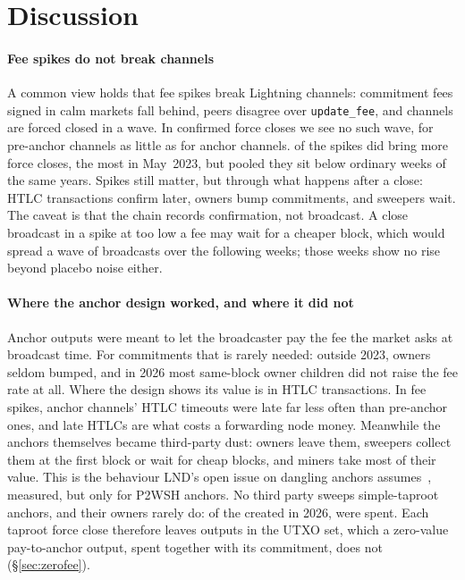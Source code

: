 \section{Discussion}
\label{sec:discussion}

\paragraph{Fee spikes do not break channels}
A common view holds that fee spikes break Lightning channels: commitment fees signed in calm markets fall behind,
peers disagree over \texttt{update\_fee}, and channels are forced closed in a wave. In confirmed force closes we see no
such wave, for pre-anchor channels as little as for anchor channels. \NSpikesUp{} of the \NSpikes{} spikes did bring
more force closes, the most in May~2023, but pooled they sit below ordinary weeks of the same years.
Spikes still matter, but through what happens after a close: HTLC transactions confirm later, owners bump commitments,
and sweepers wait. The caveat is that the chain records confirmation, not broadcast. A close broadcast in a spike at
too low a fee may wait for a cheaper block, which would spread a wave of broadcasts over the following weeks; those
weeks show no rise beyond placebo noise either.

\paragraph{Where the anchor design worked, and where it did not}
Anchor outputs were meant to let the broadcaster pay the fee the market asks at broadcast time. For commitments that
is rarely needed: outside 2023, owners seldom bumped, and in 2026 most same-block owner children did not raise the fee
rate at all. Where the design shows its value is in HTLC transactions. In fee spikes, anchor channels' HTLC timeouts
were late far less often than pre-anchor ones, and late HTLCs are what costs a forwarding node money. Meanwhile the
anchors themselves became third-party dust: owners leave them, sweepers collect them at the first block or wait for
cheap blocks, and miners take most of their value. This is the behaviour LND's open issue on dangling anchors
assumes~\cite{lnd8997}, measured, but only for P2WSH anchors. No third party sweeps simple-taproot anchors, and their
owners rarely do: of the \TaprootAnchorsTwentySix{} created in 2026, \TaprootAnchorsSpentTwentySix{} were spent. Each
taproot force close therefore leaves outputs in the UTXO set, which a zero-value pay-to-anchor output, spent together
with its commitment, does not (\S\ref{sec:zerofee}).

